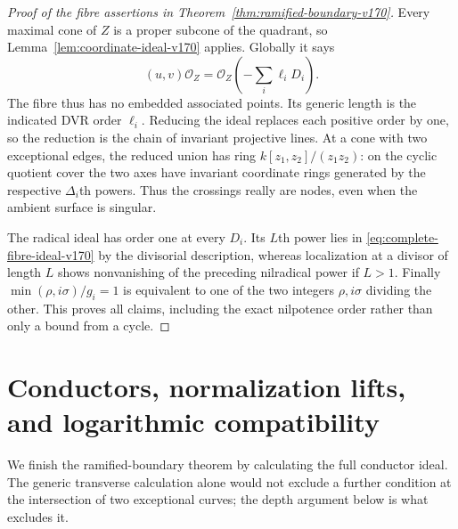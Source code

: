\documentclass[11pt,reqno]{amsart}
\numberwithin{equation}{section}
\theoremstyle{definition}\newtheorem{definition}[theorem]{Definition}
\theoremstyle{remark}\newtheorem{remark}[theorem]{Remark}
\newcommand{\OO}{\mathcal O}\newcommand{\II}{\mathcal I}
\begin{document}
\begin{proof}[Proof of the fibre assertions in Theorem~\ref{thm:ramified-boundary-v170}]
Every maximal cone of $Z$ is a proper subcone of the quadrant, so
Lemma~\ref{lem:coordinate-ideal-v170} applies. Globally it says
\begin{equation}\label{eq:complete-fibre-ideal-v170}
 (u,v)\OO_Z=\OO_Z\left(-\sum_i\ell_iD_i\right).
\end{equation}
The fibre thus has no embedded associated points. Its generic length
is the indicated DVR order $\ell_i$. Reducing the ideal replaces
each positive order by one, so the reduction is the chain of
invariant projective lines. At a cone with two exceptional edges,
the reduced union has ring $k[z_1,z_2]/(z_1z_2)$: on the cyclic
quotient cover the two axes have invariant coordinate rings generated
by the respective $\Delta_i$th powers. Thus the crossings really
are nodes, even when the ambient surface is singular.

The radical ideal has order one at every $D_i$. Its $L$th power lies
in \eqref{eq:complete-fibre-ideal-v170} by the divisorial description,
whereas localization at a divisor of length $L$ shows nonvanishing
of the preceding nilradical power if $L>1$. Finally
$\min(\rho,i\sigma)/g_i=1$ is equivalent to one of the two integers
$\rho,i\sigma$ dividing the other. This proves all claims, including
the exact nilpotence order rather than only a bound from a cycle.
\end{proof}

\section{Conductors, normalization lifts, and logarithmic compatibility}
\label{sec:conductors-v170}
We finish the ramified-boundary theorem by calculating the full
conductor ideal. The generic transverse calculation alone would not
exclude a further condition at the intersection of two exceptional
curves; the depth argument below is what excludes it.
\end{document}
